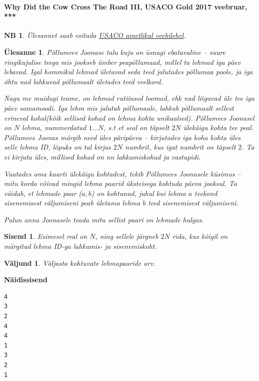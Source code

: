 \documentclass{trkut}
\newtheorem*{extra}{NB}
\newtheorem*{Input}{Sisend}
\newtheorem*{Output}{Väljund}
\newtheorem*{Text}{Ülesanne}
\begin{document}
\paragraph{Why Did the Cow Cross The Road III, USACO Gold 2017 veebruar, ***}
\begin{extra}
Ülesannet saab esitada \href{http://www.usaco.org/index.php?page=viewproblem2&cpid=719}{USACO ametlikul veebilehel}.
\end{extra}
\begin{Text}
Põllumees Joonase talu kuju on üsnagi ebatavaline -- suure ringikujulise teega mis jookseb ümber peapõllumaad, millel ta lehmad iga päev lebavad.
Igal hommikul lehmad ületavad seda teed jalutades põllumaa poole, ja iga õhtu nad lahkuvad põllumaalt ületades teed veelkord.

Nagu me muidugi teame, on lehmad rutiinsed loomad, ehk nad liiguvad üle tee iga päev samamoodi. Iga lehm mis jalutab põllumaale, lahkub põllumaalt sellest erineval kohal(kõik sellised kohad on lehma kohta unikaalsed). Põllumees Joonasel on $N$ lehma, nummerdatud $1...N$, s.t et seal on täpselt $2N$ ülekäigu kohta tee peal. Põllumees Joonas märgib need üles päripäeva -- kirjutades iga koha kohta üles selle lehma ID, lõpuks on tal kirjas $2N$ numbrit, kus igat numbrit on täpselt $2$. Ta ei kirjuta üles, millised kohad on nn lahkumiskohad ja vastupidi.

Vaatades oma kaarti ülekäigu kohtadest, tekib Põllumees Joonasele küsimus -- mitu korda võivad mingid lehma paarid üksteisega kohtuda päeva jooksul. Ta väidab, et lehmade paar ($a, b$) on kohtunud, juhul kui lehma $a$ teekond sisenemisest väljumiseni peab ületama lehma $b$ teed sisenemisest väljumiseni.

Palun anna Joonasele teada mitu sellist paari on lehmade hulgas.

\parencite{20}
\end{Text}
\begin{Input}
Esimesel real on $N$, ning sellele järgneb $2N$ rida, kus kõigil on märgitud lehma ID-ga lahkumis- ja sisenemiskoht.
\end{Input}
\begin{Output}
Väljasta kohtuvate lehmapaaride arv.
\end{Output}



\textbf{Näidissisend}

\begin{verbatim}
4
3
2
4
4
1
3
2
1
\end{verbatim}
\end{document}
